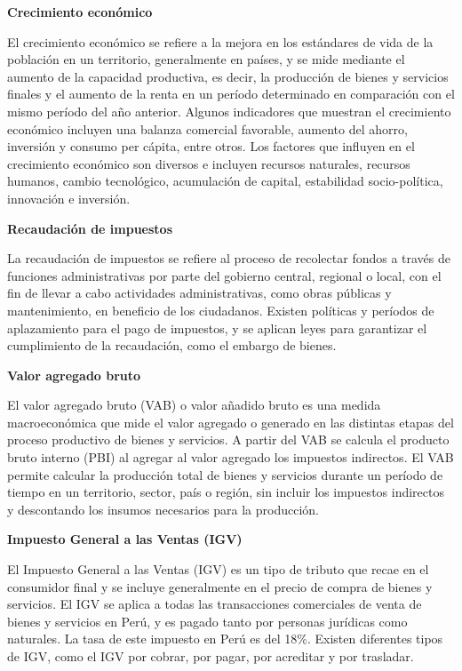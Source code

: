 \documentclass[
  letterpaper,
  DIV=11,
  numbers=noendperiod]{scrartcl}
\begin{document}
\textbf{Crecimiento económico}

El crecimiento económico se refiere a la mejora en los estándares de
vida de la población en un territorio, generalmente en países, y se mide
mediante el aumento de la capacidad productiva, es decir, la producción
de bienes y servicios finales y el aumento de la renta en un período
determinado en comparación con el mismo período del año anterior.
Algunos indicadores que muestran el crecimiento económico incluyen una
balanza comercial favorable, aumento del ahorro, inversión y consumo per
cápita, entre otros. Los factores que influyen en el crecimiento
económico son diversos e incluyen recursos naturales, recursos humanos,
cambio tecnológico, acumulación de capital, estabilidad socio-política,
innovación e inversión.

\textbf{Recaudación de impuestos}

La recaudación de impuestos se refiere al proceso de recolectar fondos a
través de funciones administrativas por parte del gobierno central,
regional o local, con el fin de llevar a cabo actividades
administrativas, como obras públicas y mantenimiento, en beneficio de
los ciudadanos. Existen políticas y períodos de aplazamiento para el
pago de impuestos, y se aplican leyes para garantizar el cumplimiento de
la recaudación, como el embargo de bienes.

\textbf{Valor agregado bruto}

El valor agregado bruto (VAB) o valor añadido bruto es una medida
macroeconómica que mide el valor agregado o generado en las distintas
etapas del proceso productivo de bienes y servicios. A partir del VAB se
calcula el producto bruto interno (PBI) al agregar al valor agregado los
impuestos indirectos. El VAB permite calcular la producción total de
bienes y servicios durante un período de tiempo en un territorio,
sector, país o región, sin incluir los impuestos indirectos y
descontando los insumos necesarios para la producción.

\textbf{Impuesto General a las Ventas (IGV)}

El Impuesto General a las Ventas (IGV) es un tipo de tributo que recae
en el consumidor final y se incluye generalmente en el precio de compra
de bienes y servicios. El IGV se aplica a todas las transacciones
comerciales de venta de bienes y servicios en Perú, y es pagado tanto
por personas jurídicas como naturales. La tasa de este impuesto en Perú
es del 18\%. Existen diferentes tipos de IGV, como el IGV por cobrar,
por pagar, por acreditar y por trasladar.
\end{document}
